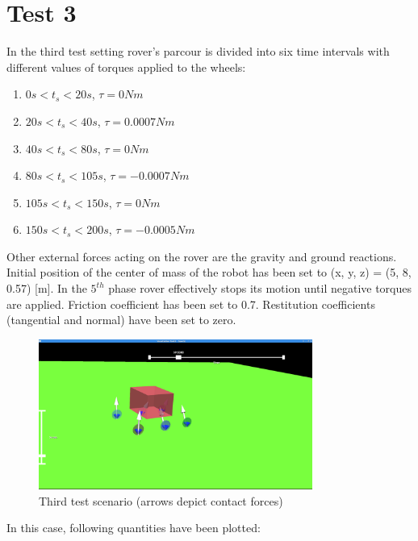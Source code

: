 \newpage
\section{Test 3}
\label{Sec:test_3}

In the third test setting rover's parcour is divided into six time intervals with different values of torques applied to the wheels:

\begin{enumerate} 
  \item $0s < t_s < 20s$, $\tau = 0Nm$           
  \item $20s < t_s < 40s$, $\tau = 0.0007Nm$        
  \item $40s < t_s < 80s$, $\tau = 0Nm$         
  \item $80s < t_s < 105s$, $\tau = -0.0007Nm$
  \item $105s < t_s < 150s$, $\tau = 0Nm$         
  \item $150s < t_s < 200s$, $\tau = -0.0005Nm$ 
\end{enumerate}

\noindent Other external forces acting on the rover are the gravity and ground reactions. Initial position of the center of mass of the robot
has been set to (x, y, z) = (5, 8, 0.57) [m]. In the $5^{th}$ phase rover effectively stops its motion until negative torques are applied.
Friction coefficient has been set to 0.7. Restitution coefficients (tangential and normal) have been set to zero. 

\begin{figure}[H]
  \centering
    \includegraphics[width=0.8\textwidth]{run_3}
  \caption{Third test scenario (arrows depict contact forces)}
\end{figure}

\noindent In this case, following quantities have been plotted:

